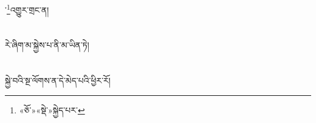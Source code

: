 ་\footnote{«ཅོ་»«སྡེ་»སྐྱེད་པར་}འགྱུར་གྲང་ན།\chapter{ }རེ་ཞིག་མ་སྐྱེས་པ་ནི་མ་ཡིན་ཏེ།\chapter{ }སྐྱེ་བའི་སྔ་ལོགས་ན་དེ་མེད་པའི་ཕྱིར་རོ།\ch